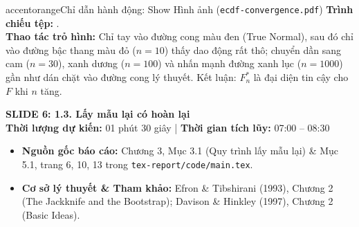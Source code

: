 \documentclass[10pt,a4paper]{article}
\newcommand{\slideheader}[4]{
    \vspace{0.4cm}
    \begin{tcolorbox}[colback=primary!7!white, colframe=primary, arc=2mm, boxrule=1pt, left=4mm, right=4mm, top=2.5mm, bottom=2.5mm]
        {\Large\bfseries\color{primary} SLIDE #1: #2}\\[0.1cm]
        {\small\textbf{Thời lượng dự kiến:} #3 \quad | \quad \textbf{Thời gian tích lũy:} #4}
    \end{tcolorbox}
    \vspace{0.15cm}
}
\begin{document}
\begin{actionbox}{accentorange}{Chỉ dẫn hành động: Show Hình ảnh (\texttt{ecdf-convergence.pdf})}
    \textbf{Trình chiếu tệp:} .\\
    \textbf{Thao tác trỏ hình:} Chỉ tay vào đường cong màu đen (True Normal), sau đó chỉ vào đường bậc thang màu đỏ ($n=10$) thấy dao động rất thô; chuyển dần sang cam ($n=30$), xanh dương ($n=100$) và nhấn mạnh đường xanh lục ($n=1000$) gần như dán chặt vào đường cong lý thuyết. Kết luận: $F_n^*$ là đại diện tin cậy cho $F$ khi $n$ tăng.
\end{actionbox}

\newpage

\slideheader{6}{1.3. Lấy mẫu lại có hoàn lại}{01 phút 30 giây}{07:00 -- 08:30}

\begin{itemize}
    \item \textbf{Nguồn gốc báo cáo:} Chương 3, Mục 3.1 (Quy trình lấy mẫu lại) \& Mục 5.1, trang 6, 10, 13 trong \texttt{tex-report/code/main.tex}.
    \item \textbf{Cơ sở lý thuyết \& Tham khảo:} Efron \& Tibshirani (1993), Chương 2 (The Jackknife and the Bootstrap); Davison \& Hinkley (1997), Chương 2 (Basic Ideas).
\end{itemize}
\end{document}
